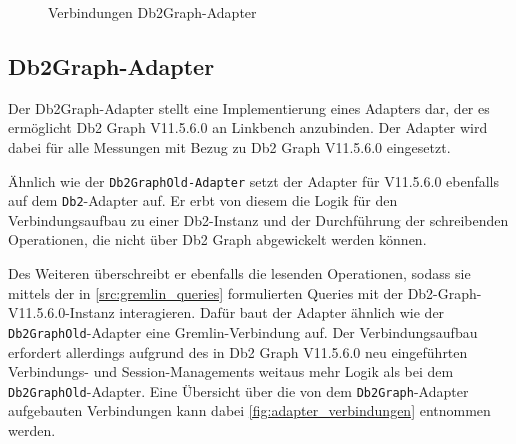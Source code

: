\begin{figure}[!ht]
    \centering
    \caption{Verbindungen Db2Graph-Adapter}
    \label{fig:adapter_verbindungen}
\end{figure}

\subsection{Db2Graph-Adapter}
\label{implementierung:adapter:db2graph:ga}
Der Db2Graph-Adapter stellt eine Implementierung eines Adapters dar, der es ermöglicht Db2 Graph V11.5.6.0 an Linkbench anzubinden. Der Adapter wird dabei für alle Messungen mit Bezug zu Db2 Graph V11.5.6.0 eingesetzt. 

Ähnlich wie der \texttt{Db2GraphOld-Adapter} setzt der Adapter für V11.5.6.0 ebenfalls auf dem \texttt{Db2}-Adapter auf. Er erbt von diesem die Logik für den Verbindungsaufbau zu einer Db2-Instanz und der Durchführung der schreibenden Operationen, die nicht über Db2 Graph abgewickelt werden können. 

Des Weiteren überschreibt er ebenfalls die lesenden Operationen, sodass sie mittels der in \autoref{src:gremlin_queries} formulierten Queries mit der Db2-Graph-V11.5.6.0-Instanz interagieren. Dafür baut der Adapter ähnlich wie der \texttt{Db2Graph\allowbreak Old}-Adapter eine Gremlin-Verbindung auf. Der Verbindungsaufbau erfordert allerdings aufgrund des in Db2 Graph V11.5.6.0 neu eingeführten Verbindungs- und Session-Managements weitaus mehr Logik als bei dem \texttt{Db2GraphOld}-Adapter. Eine Übersicht über die von dem \texttt{Db2Graph}-Adapter aufgebauten Verbindungen kann dabei \autoref{fig:adapter_verbindungen} entnommen werden.

